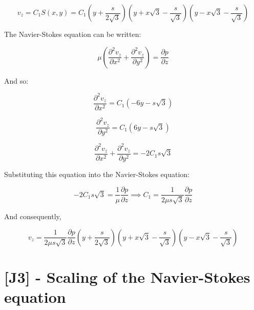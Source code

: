\begin{equation}
v_z = C_1 S(x,y) = C_1 \left( y + \frac{s}{2\sqrt{3}} \right) \left( y + x\sqrt{3} - \frac{s}{\sqrt{3}} \right) \left( y - x\sqrt{3} - \frac{s}{\sqrt{3}} \right)
\end{equation}

The Navier-Stokes equation can be written:

\begin{equation}
\mu \left( \frac{\partial^2 v_z}{\partial x^2} + \frac{\partial^2 v_z}{\partial y^2} \right) = \frac{\partial p}{\partial z}
\end{equation}

And so:

\begin{equation}
\frac{\partial^2 v_z}{\partial x^2} = C_1 (-6y - s\sqrt{3})
\end{equation}

\begin{equation}
\frac{\partial^2 v_z}{\partial y^2} = C_1 (6y - s\sqrt{3})
\end{equation}


\begin{equation}
\frac{\partial^2 v_z}{\partial x^2} + \frac{\partial^2 v_z}{\partial y^2} = - 2 C_1 s\sqrt{3}
\end{equation}

Substituting this equation into the Navier-Stokes equation:


\begin{equation}
- 2 C_1 s\sqrt{3} = \frac{1}{\mu}\frac{\partial p}{\partial z} \implies C_1 = \frac{1}{2\mu s\sqrt{3}}\frac{\partial p}{\partial z}
\end{equation}

And consequently,


\begin{equation}
v_z = \frac{1}{2\mu s\sqrt{3}}\frac{\partial p}{\partial z} \left( y + \frac{s}{2\sqrt{3}} \right) \left( y + x\sqrt{3} - \frac{s}{\sqrt{3}} \right) \left( y - x\sqrt{3} - \frac{s}{\sqrt{3}} \right)
\end{equation}

\section{[J3] - Scaling of the Navier-Stokes equation}
\label{prob95}



